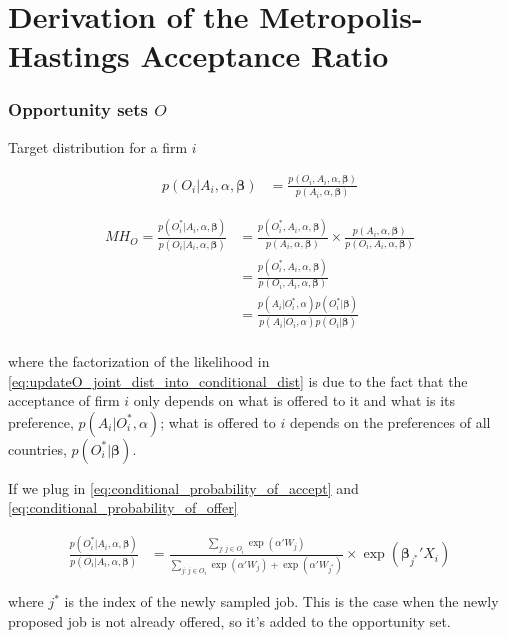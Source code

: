 \chapter{Derivation of the Metropolis-Hastings Acceptance Ratio}
\label{chap:MH_ratio}

\subsection{Opportunity sets $O$}

Target distribution for a firm $i$ 

\begin{align}
p(O_i | A_i, \alpha, \bm{\beta}) &= \frac{p(O_i, A_i, \alpha, \bm{\beta})}{p(A_i, \alpha, \bm{\beta})}
\end{align}

\begin{align}
MH_O = \frac{p(O_i^* | A_i, \alpha, \bm{\beta})}{p(O_i | A_i, \alpha, \bm{\beta})} &= \frac{p(O_i^*, A_i, \alpha, \bm{\beta})}{p(A_i, \alpha, \bm{\beta})} \times \frac{p(A_i, \alpha, \bm{\beta})}{p(O_i, A_i, \alpha, \bm{\beta})} \\
&= \frac{p(O_i^*, A_i, \alpha, \bm{\beta})}{p(O_i, A_i, \alpha, \bm{\beta})} \\
&= \frac{p(A_i | O_i^*, \alpha)p(O_i^*|\bm{\beta})}{p(A_i | O_i, \alpha)p(O_i|\bm{\beta})} \label{eq:updateO_joint_dist_into_conditional_dist} \\
\end{align}

where the factorization of the likelihood in \eqref{eq:updateO_joint_dist_into_conditional_dist} is due to the fact that the acceptance of firm $i$ only depends on what is offered to it and what is its preference, $p(A_i | O_i^*, \alpha)$; what is offered to $i$ depends on the preferences of all countries, $p(O_i^* | \bm{\beta})$.

If we plug in \eqref{eq:conditional_probability_of_accept} and \eqref{eq:conditional_probability_of_offer}

\begin{align}
\frac{p(O_i^* | A_i, \alpha, \bm{\beta})}{p(O_i | A_i, \alpha, \bm{\beta})} &= \frac{\sum\limits_{j:j \in O_i} \exp(\alpha'W_j)}{\sum\limits_{j:j \in O_i} \exp(\alpha'W_j) + \exp(\alpha' W_{j^*})} \times \exp(\bm{\beta}_{j^*}'X_i)
\end{align}

where $j^*$ is the index of the newly sampled job. This is the case when the newly proposed job is not already offered, so it's added to the opportunity set.

